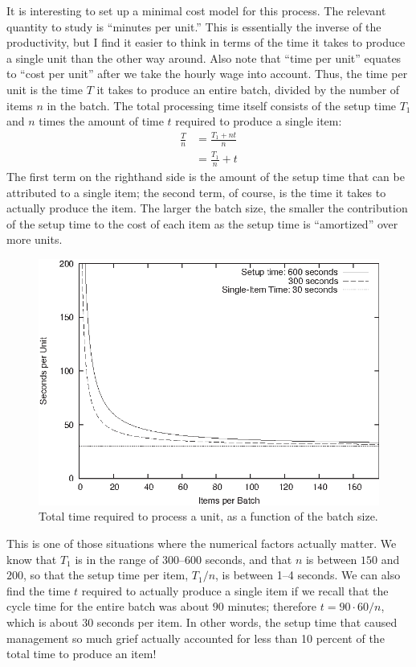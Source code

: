 It is interesting to set up a minimal cost model for this process.
The relevant quantity to study is ``minutes per unit.'' This is
essentially the inverse of the productivity, but I find it easier to
think in terms of the time it takes to produce a single unit than the
other way around. Also note that ``time per unit'' equates to ``cost
per unit'' after we take the hourly wage into account. Thus, the time
per unit is the time $T$ it takes to produce an entire batch, divided
by the number of items $n$ in the batch. The total processing time
itself consists of the setup time $T_1$ and $n$ times the amount of
time $t$ required to produce a single item:
%
\begin{align*}
\frac{T}{n} & = \frac{ T_1 + n t }{n} \\
            & = \frac{T_1}{n} + t
\end{align*}
%
The first term on the righthand side is the amount of the setup time
that can be attributed to a single item; the second term, of course,
is the time it takes to actually produce the item. The larger the
batch size, the smaller the contribution of the setup time to the cost
of each item as the setup time is ``amortized'' over more units.

\begin{figure}
  \centerline{\includegraphics{img/batchsize}}
  \caption{Total time required to process a unit, as a function of the
    batch size.}
  \label{fig:batchsize}
\end{figure}

This is one of those situations where the numerical factors actually
matter. We know that $T_1$ is in the range of 300--600 seconds, and
that $n$ is between $150$ and $200$, so that the setup time per item,
$T_1/n$, is between 1--4 seconds. We can also find the time $t$ required
to actually produce a single item if we recall that the cycle time for
the entire batch was about $90$ minutes; therefore $t = 90 \cdot 60
/n$, which is about $30$ seconds per item. In other words, the setup
time that caused management so much grief actually accounted for less
than 10 percent of the total time to produce an item!

